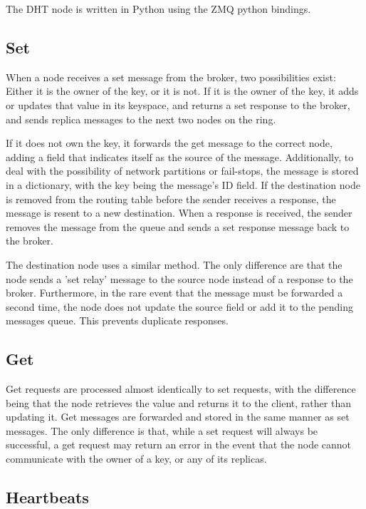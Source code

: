 \documentclass[11pt]{article}
\begin{document}
The DHT node is written in Python using the ZMQ python bindings. 

\subsection{Set}\label{sec:get}

When a node receives a set message from the broker, two possibilities exist: Either it is the owner of the key, or it is not. If it is the owner of the key, it adds or updates that value in its keyspace, and returns a set response to the broker, and sends replica messages to the next two nodes on the ring.

If it does not own the key, it forwards the get message to the correct node, adding a field that indicates itself as the source of the message. Additionally, to deal with the possibility of network partitions or fail-stops, the message is stored in a dictionary, with the key being the message's ID field. If the destination node is removed from the routing table before the sender receives a response, the message is resent to a new destination. When a response is received, the sender removes the message from the queue and sends a set response message back to the broker.

The destination node uses a similar method. The only difference are that the node sends a 'set relay' message to the source node instead of a response to the broker. Furthermore, in the rare event that the message must be forwarded a second time, the node does not update the source field or add it to the pending messages queue. This prevents duplicate responses.

\subsection{Get}\label{sec:get}

Get requests are processed almost identically to set requests, with the difference being that the node retrieves the value and returns it to the client, rather than updating it. Get messages are forwarded and stored in the same manner as set messages. The only difference is that, while a set request will always be successful, a get request may return an error in the event that the node cannot communicate with the owner of a key, or any of its replicas.

\subsection{Heartbeats}\label{sec:HB}
\end{document}
